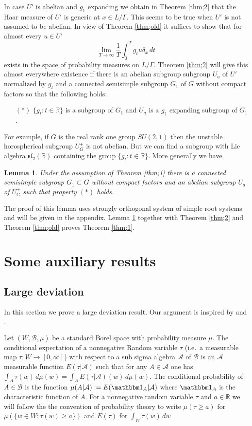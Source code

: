 \documentclass[12pt]{amsart}
\newtheorem{lem}[thm]{Lemma}
\theoremstyle{definition}
\theoremstyle{remark}
\numberwithin{equation}{section}
\begin{document}
In case $U'$ is abelian and $g_1$ expanding
  we 
obtain in  Theorem \ref{thm;2} that the Haar measure of $U'$ is generic at $x\in L/\Gamma$. 
This seems to be true  when $U'$  is not assumed to be abelian. In view of  Theorem \ref{thm;old} 
it suffices to  show that for almost every $u\in U'$
\[
\lim_{T\to \infty}\frac{1}{T}\int_0^T g_tu \delta_{x} \,dt
\] 
exists in the space of probability measures on $L/\Gamma$. 
Theorem \ref{thm;2} will give this
almost everywhere existence 
 if there is an abelian subgroup  subgroup $U_a$ of $U'$ 
normalized by $g_t$ and a connected semisimple subgroup $G_1$ of $G$ without compact factors 
so that the following holds:
\begin{itemize}
\item[$(*)$]
$\{g_t: t\in \mathbb R\}$ is a subgroup of
$G_1$ and 
$U_a$ is a $ g_1 $ expanding subgroup of $G_1$.  
\end{itemize}

For example, if $G$ is the real rank one group $SU(2,1)$ then
the unstable horospherical  subgroup $U_G^+$ is not abelian. 
But we can find a subgroup with Lie algebra $\mathfrak{sl}_2(\mathbb R)$ containing the group 
$\{g_t: t\in \mathbb R\}$. More generally we have
\begin{lem}\label{lem;abelian}
Under the assumption of Theorem \ref{thm;1} there is a connected
 semisimple  subgroup $G_1\subset G$ without compact factors 
and an abelian subgroup $U_a$ of $U_G^+$ such that property $(*)$ holds.
\end{lem}
The proof of this lemma uses  strongly orthogonal system of simple 
root systems
and will be given in the appendix.  
Lemma \ref{lem;abelian} together with 
Theorem \ref{thm;2} and  Theorem \ref{thm;old}  proves
Theorem \ref{thm;1}.

  
  

 

\section{Some auxiliary results}
\subsection{Large deviation}
In this section we prove a large deviation result. 
Our argument is inspired by 
\cite{bq13} and \cite{a}.

Let $(W, \mathcal B, \mu)$ be a standard Borel  space with probability measure $\mu$. 
The  conditional expectation of 
a  nonnegative   Random variable 
$\tau$ (i.e.~a measurable  map $\tau: W\to [0, \infty]$)
with respect to   
  a sub sigma algebra
$\mathcal A$ of $\mathcal B$     is an $\mathcal A$ measurable function 
$E(\tau| \mathcal A)$  such that for any $A\in \mathcal A$ one has
$\int_A\tau(w)\, d\mu(w)=\int_AE(\tau| \mathcal A)(w)\, d\mu(w)$.
The conditional probability of $A\in \mathcal B$  is  the function
$
\mu(A|\mathcal A):=E(\mathbbm 1_A|\mathcal A)
$ 
where $ \mathbbm 1 _A$ is the characteristic function of $A$. 
For a nonnegative  random variable $\tau$ and $a\in \mathbb R$
we will follow the the convention of probability theory to write 
$\mu(\tau \ge a)$ for $\mu(\{w\in W: \tau(w)\ge a\})$ and $E(\tau)$
for $\int _W \tau (w)\, dw$
\end{document}
